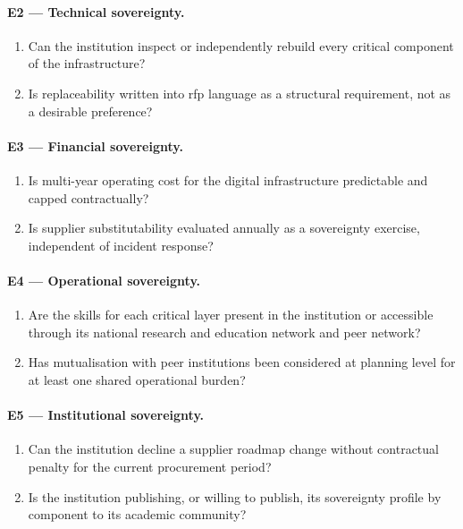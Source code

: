 \paragraph{E2 --- Technical sovereignty.}
\begin{enumerate}[leftmargin=2em,nosep,label=E2.\arabic*.]
  \item Can the institution inspect or independently rebuild every
  critical component of the infrastructure?
  \item Is replaceability written into \gls{rfp} language as a
  structural requirement, not as a desirable preference?
\end{enumerate}

\paragraph{E3 --- Financial sovereignty.}
\begin{enumerate}[leftmargin=2em,nosep,label=E3.\arabic*.]
  \item Is multi-year operating cost for the digital infrastructure
  predictable and capped contractually?
  \item Is supplier substitutability evaluated annually as a
  sovereignty exercise, independent of incident response?
\end{enumerate}

\paragraph{E4 --- Operational sovereignty.}
\begin{enumerate}[leftmargin=2em,nosep,label=E4.\arabic*.]
  \item Are the skills for each critical layer present in the
  institution or accessible through its national research and
  education network and peer network?
  \item Has mutualisation with peer institutions been considered at
  planning level for at least one shared operational burden?
\end{enumerate}

\paragraph{E5 --- Institutional sovereignty.}
\begin{enumerate}[leftmargin=2em,nosep,label=E5.\arabic*.]
  \item Can the institution decline a supplier roadmap change without
  contractual penalty for the current procurement period?
  \item Is the institution publishing, or willing to publish, its
  sovereignty profile by component to its academic community?
\end{enumerate}

